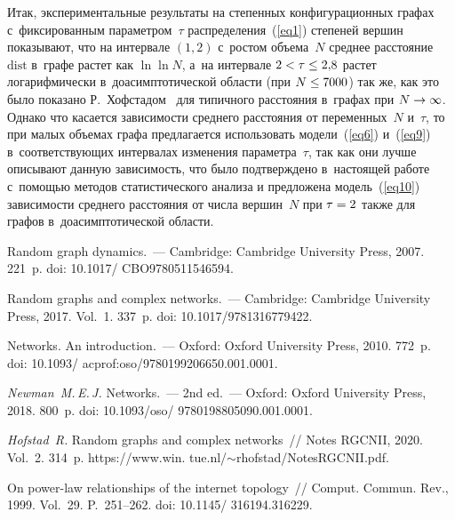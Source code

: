 \begin{multicols}{2}
Итак, экспериментальные результаты на степенных конфигурационных графах с~фиксированным
па\-ра\-мет\-ром~$\tau$ распределения~(\ref{eq1}) степеней вершин показывают, что на интервале $(1,2)$ 
с~рос\-том объема~$N$ среднее расстояние $\mathrm{dist}$ в~графе рас\-тет как $\ln\ln N$, а~на интервале $2\hm<\tau\hm\leq 2{,}8$
рас\-тет логарифмически в~доасимптотической об\-ласти (при $N\hm\leq 7000$) так же, как это было показано
Р.~Хофстадом~\cite{Hof2} для типичного расстояния в~графах при $N\hm\rightarrow\infty$.
Однако что касается за\-ви\-си\-мости среднего расстояния от переменных~$N$ и~$\tau$, то при малых
объемах графа предлагается использовать модели~(\ref{eq6}) и~(\ref{eq9}) в~соответствующих интервалах
изменения параметра~$\tau$, так как они лучше описывают данную за\-ви\-си\-мость, что было под\-тверж\-де\-но
в~настоящей работе с~по\-мощью методов статистического анализа
и предложена модель~(\ref{eq10}) за\-ви\-си\-мости сред\-не\-го рас\-сто\-яния от чис\-ла вершин~$N$ при $\tau\hm=2$
так\-же для графов в~до\-асимп\-то\-ти\-че\-ской об\-ласти.

{\small\frenchspacing
 {\baselineskip=10.7pt
 \begin{thebibliography}{99}
 
 
 Random graph dynamics.~--- Cambridge: Cambridge University
Press, 2007. 221~p. doi: 10.1017/ CBO9780511546594.

 Random graphs and complex networks.~--- Cambridge:
Cambridge University Press, 2017.  Vol.~1. 337~p. doi: 10.1017/9781316779422.



 Networks. An introduction.~--- Oxford: Oxford University Press, 2010. 772~p.
doi: 10.1093/ acprof:oso/9780199206650.001.0001.

\textit{Newman~M.\,E.\,J.} Networks.~--- 2nd ed.~--- Oxford: Oxford University Press, 2018. 800~p.
doi: 10.1093/oso/ 9780198805090.001.0001.

\textit{Hofstad~R.} Random graphs and complex networks~// Notes RGCNII, 2020.  Vol.~2.
314~p. {\sf https://www.win. tue.nl/$\sim$rhofstad/NotesRGCNII.pdf.}

 On power-law relationships of
the internet topology~// Comput. Commun. Rev., 1999. Vol.~29. P.~251--262.
doi: 10.1145/ 316194.316229.


\end{thebibliography}}}
\end{multicols}
